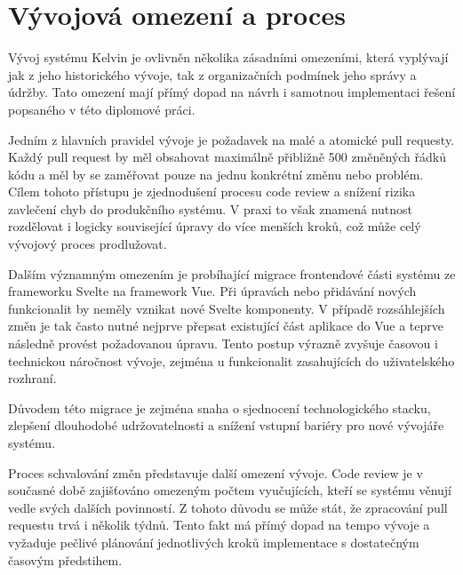 \section{Vývojová omezení a proces}
\label{sec:kelvin-development}

Vývoj systému Kelvin je ovlivněn několika zásadními omezeními, která vyplývají jak z jeho historického vývoje, tak z organizačních podmínek jeho správy a údržby.
Tato omezení mají přímý dopad na návrh i samotnou implementaci řešení popsaného v této diplomové práci.

Jedním z hlavních pravidel vývoje je požadavek na malé a atomické pull requesty.
Každý pull request by měl obsahovat maximálně přibližně 500 změněných řádků kódu a měl by se zaměřovat pouze na jednu konkrétní změnu nebo problém.
Cílem tohoto přístupu je zjednodušení procesu code review a snížení rizika zavlečení chyb do produkčního systému.
V praxi to však znamená nutnost rozdělovat i logicky související úpravy do více menších kroků, což může celý vývojový proces prodlužovat.

Dalším významným omezením je probíhající migrace frontendové části systému ze frameworku Svelte na framework Vue.
Při úpravách nebo přidávání nových funkcionalit by neměly vznikat nové Svelte komponenty.
V případě rozsáhlejších změn je tak často nutné nejprve přepsat existující část aplikace do Vue a teprve následně provést požadovanou úpravu.
Tento postup výrazně zvyšuje časovou i technickou náročnost vývoje, zejména u funkcionalit zasahujících do uživatelského rozhraní.

Důvodem této migrace je zejména snaha o sjednocení technologického stacku, zlepšení dlouhodobé udržovatelnosti a snížení vstupní bariéry pro nové vývojáře systému.

Proces schvalování změn představuje další omezení vývoje.
Code review je v současné době zajišťováno omezeným počtem vyučujících, kteří se systému věnují vedle svých dalších povinností.
Z tohoto důvodu se může stát, že zpracování pull requestu trvá i několik týdnů.
Tento fakt má přímý dopad na tempo vývoje a vyžaduje pečlivé plánování jednotlivých kroků implementace s dostatečným časovým předstihem.

\endinput